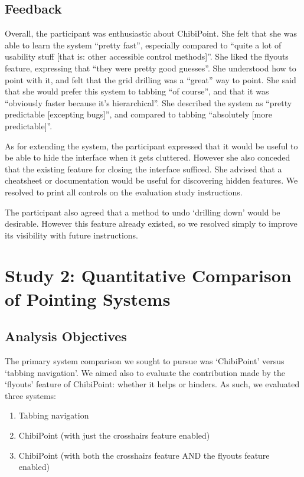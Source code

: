 \documentclass[11pt,openright,a4paper]{report}
\begin{document}
\subsection{Feedback}
\label{sec:usability_feedback}
Overall, the participant was enthusiastic about ChibiPoint. She felt that she was able to learn the system ``pretty fast'', especially compared to ``quite a lot of usability stuff [that is: other accessible control methods]''. She liked the flyouts feature, expressing that ``they were pretty good guesses''. She understood how to point with it, and felt that the grid drilling was a ``great'' way to point. She said that she would prefer this system to tabbing ``of course'', and that it was ``obviously faster because it's hierarchical''. She described the system as ``pretty predictable [excepting bugs]'', and compared to tabbing ``absolutely [more predictable]''.

As for extending the system, the participant expressed that it would be useful to be able to hide the interface when it gets cluttered. However she also conceded that the existing feature for closing the interface sufficed. She advised that a cheatsheet or documentation would be useful for discovering hidden features. We resolved to print all controls on the evaluation study instructions.

The participant also agreed that a method to undo `drilling down' would be desirable. However this feature already existed, so we resolved simply to improve its visibility with future instructions.

\section{Study 2: Quantitative Comparison of Pointing Systems}
\subsection{Analysis Objectives}
\label{sec:systemcomparisonobjectives}
The primary system comparison we sought to pursue was `ChibiPoint' versus `tabbing navigation'. We aimed also to evaluate the contribution made by the `flyouts' feature of ChibiPoint: whether it helps or hinders. As such, we evaluated three systems:
\begin{enumerate}
\item Tabbing navigation
\item ChibiPoint (with just the crosshairs feature enabled)
\item ChibiPoint (with both the crosshairs feature AND the flyouts feature enabled)
\end{enumerate}
\end{document}
